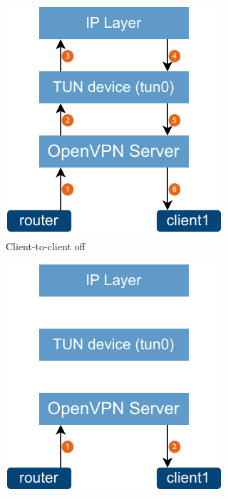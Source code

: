 \begin{figure}[H]
    \centering
    \begin{subfigure}{0.49\linewidth}
        \centering
        \includegraphics[width=1\linewidth]{immagini/diag2-client-to-client-off}
        \caption{Client-to-client off}
        \label{fig:diag2-client-to-client-off}
    \end{subfigure}
    \hfill
    \begin{subfigure}{0.49\linewidth}
        \centering
        \includegraphics[width=1\linewidth]{immagini/diag2-client-to-client-on}

\end{subfigure}
\end{figure}
